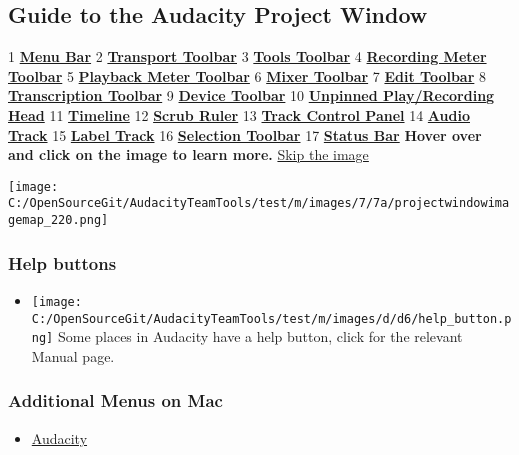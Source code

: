 \begin{multicols}{2}
\subsection{Guide to the Audacity Project Window}
\label{index:reference}1\textbf{
\hyperref[\foo{man:menu:reference:}]{Menu Bar}
}2\textbf{
\hyperref[\foo{man:transport:toolbar:}]{Transport Toolbar}
}3\textbf{
\hyperref[\foo{man:tools:toolbar:}]{Tools Toolbar}
}4\textbf{
\hyperref[\foo{man:meter:toolbar:recording}]{Recording Meter Toolbar}
}5\textbf{
\hyperref[\foo{man:meter:toolbar:playback}]{Playback Meter Toolbar}
}6\textbf{
\hyperref[\foo{man:mixer:toolbar:}]{Mixer Toolbar}
}7\textbf{
\hyperref[\foo{man:edit:toolbar:}]{Edit Toolbar}
}8\textbf{
\hyperref[\foo{man:transcription:toolbar:}]{Transcription Toolbar}
}9\textbf{
\hyperref[\foo{man:device:toolbar:}]{Device Toolbar}
}10\textbf{
\hyperref[\foo{man:timeline:pinned}]{Unpinned Play/Recording Head}
}11\textbf{
\hyperref[\foo{man:timeline:}]{Timeline}
}12\textbf{
\hyperref[\foo{man:scrubbing:and:seeking:scrubbing}]{Scrub Ruler}
}13\textbf{
\hyperref[\foo{man:track:control:panel:and:vertical:scale:}]{Track Control Panel}
}14\textbf{
\hyperref[\foo{man:audio:tracks:}]{Audio Track}
}15\textbf{
\hyperref[\foo{man:label:tracks:}]{Label Track}
}16\textbf{
\hyperref[\foo{man:selection:toolbar:}]{Selection Toolbar}
}17\textbf{
\hyperref[\foo{man:status:bar:}]{Status Bar}
}\textbf{Hover over and click on the image to learn more.}
\hyperref[\foo{index::skiptheimage}]{Skip the image}
\par \protect\texttt{[image: C:/OpenSourceGit/AudacityTeamTools/test/m/images/7/7a/projectwindowimagemap\_220.png]}\par 
\subsubsection{Help buttons}
\begin{itemize}
\item \protect\texttt{[image: C:/OpenSourceGit/AudacityTeamTools/test/m/images/d/d6/help\_button.png]} Some places in Audacity have a help button, click for the relevant Manual page.
\end{itemize}

\subsubsection{Additional Menus on Mac}
\begin{itemize}
\item 
\hyperref[\foo{man:audacity:menu:}]{Audacity}


\end{itemize}
\end{multicols}

